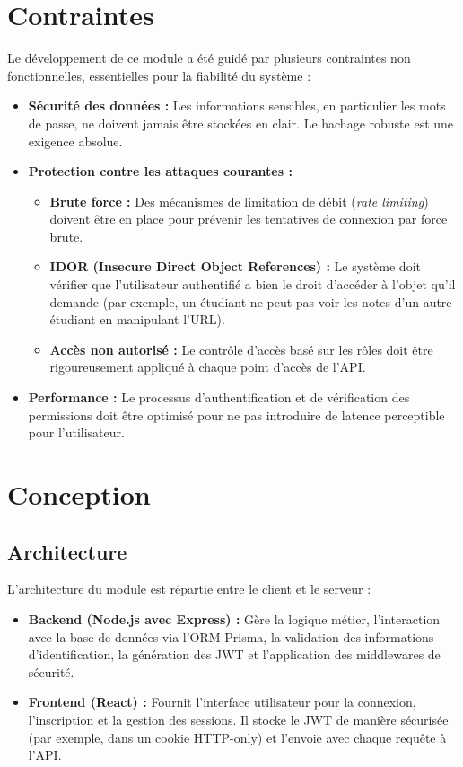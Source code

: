 \documentclass{report}
\begin{document}
\section{\color{SoftEspresso}Contraintes}
Le développement de ce module a été guidé par plusieurs contraintes non fonctionnelles, essentielles pour la fiabilité du système :
\begin{itemize}
    \item \textbf{\color{SoftEspresso}Sécurité des données :} Les informations sensibles, en particulier les mots de passe, ne doivent jamais être stockées en clair. Le hachage robuste est une exigence absolue.
    \item \textbf{\color{SoftEspresso}Protection contre les attaques courantes :}
    \begin{itemize}
        \item \textbf{\color{SoftEspresso}Brute force :} Des mécanismes de limitation de débit (\textit{rate limiting}) doivent être en place pour prévenir les tentatives de connexion par force brute.
        \item \textbf{\color{SoftEspresso}IDOR (Insecure Direct Object References) :} Le système doit vérifier que l'utilisateur authentifié a bien le droit d'accéder à l'objet qu'il demande (par exemple, un étudiant ne peut pas voir les notes d'un autre étudiant en manipulant l'URL).
        \item \textbf{\color{SoftEspresso}Accès non autorisé :} Le contrôle d'accès basé sur les rôles doit être rigoureusement appliqué à chaque point d'accès de l'API.
    \end{itemize}
    \item \textbf{\color{SoftEspresso}Performance :} Le processus d'authentification et de vérification des permissions doit être optimisé pour ne pas introduire de latence perceptible pour l'utilisateur.
\end{itemize}

\section{\color{SoftEspresso}Conception}
\subsection{\color{SoftEspresso}Architecture}
L'architecture du module est répartie entre le client et le serveur :
\begin{itemize}
    \item \textbf{\color{SoftEspresso}Backend (Node.js avec Express) :} Gère la logique métier, l'interaction avec la base de données via l'ORM Prisma, la validation des informations d'identification, la génération des JWT et l'application des middlewares de sécurité.
    \item \textbf{\color{SoftEspresso}Frontend (React) :} Fournit l'interface utilisateur pour la connexion, l'inscription et la gestion des sessions. Il stocke le JWT de manière sécurisée (par exemple, dans un cookie HTTP-only) et l'envoie avec chaque requête à l'API.
\end{itemize}
\end{document}
